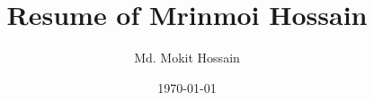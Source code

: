 \documentclass[11pt]{article}
\begin{document}
\title{Resume of Mrinmoi Hossain}
\author{Md. Mokit Hossain}
\date{\today}
\maketitle
\end{document}
